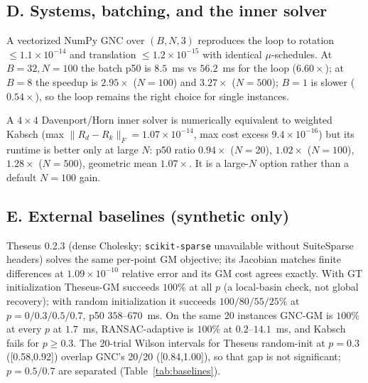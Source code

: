 \subsection*{D. Systems, batching, and the inner solver}
\label{app:systems}

A vectorized NumPy GNC over $(B,N,3)$ reproduces the loop to rotation $\le1.1\times10^{-14}$ and
translation $\le1.2\times10^{-15}$ with identical $\mu$-schedules. At $B=32,N=100$ the batch p50 is
$8.5$~ms vs $56.2$~ms for the loop ($6.60\times$); at $B=8$ the speedup is $2.95\times$ ($N=100$)
and $3.27\times$ ($N=500$); $B=1$ is slower ($0.54\times$), so the loop remains the right choice for
single instances.

A $4\times4$ Davenport/Horn inner solver \cite{horn1987} is numerically equivalent to weighted
Kabsch (max $\|R_d-R_k\|_F=1.07\times10^{-14}$, max cost excess $9.4\times10^{-16}$) but its
runtime is better only at large $N$: p50 ratio $0.94\times$ ($N=20$), $1.02\times$ ($N=100$),
$1.28\times$ ($N=500$), geometric mean $1.07\times$. It is a large-$N$ option rather than a
default $N=100$ gain.

\subsection*{E. External baselines (synthetic only)}
\label{app:baselines}

Theseus 0.2.3 (dense Cholesky; \texttt{scikit-sparse} unavailable without SuiteSparse headers)
solves the same per-point GM objective; its Jacobian matches finite differences at
$1.09\times10^{-10}$ relative error and its GM cost agrees exactly. With GT initialization Theseus-GM
succeeds $100\%$ at all $p$ (a local-basin check, not global recovery); with random initialization it
succeeds $100/80/55/25\%$ at $p=0/0.3/0.5/0.7$, p50 $358$--$670$~ms. On the same 20 instances GNC-GM
is $100\%$ at every $p$ at $1.7$~ms, RANSAC-adaptive is $100\%$ at $0.2$--$14.1$~ms, and Kabsch
fails for $p\ge0.3$. The 20-trial Wilson intervals for Theseus random-init at $p=0.3$
([0.58,0.92]) overlap GNC's 20/20 ([0.84,1.00]), so that gap is not significant; $p=0.5/0.7$ are
separated (Table~\ref{tab:baselines}).

